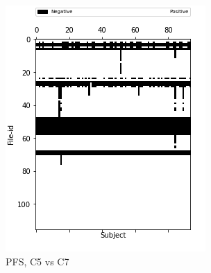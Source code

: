 \documentclass[10pt, conference, compsocconf]{IEEEtran}
\begin{document}
\begin{figure}[h!]
\begin{subfigure}[b]{0.45\linewidth}
         \includegraphics[width=\columnwidth]{data/Utility_Matrix/PreFreeSurfer/PFS_5v7_utility_matrix.png}
  \caption{PFS, C5 vs C7}
  \end{subfigure}
  \begin{subfigure}[b]{0.45\linewidth}

\end{subfigure}
\end{figure}
\end{document}
